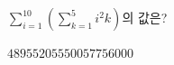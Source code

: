 $\displaystyle\sum_{i=1}^{10}\left(\sum_{k=1}^{5}i^2k\right)$의 값은?
\begin{choices32}{$4895$}{$5205$}{$5500$}{$5775$}{$6000$}\end{choices32}

